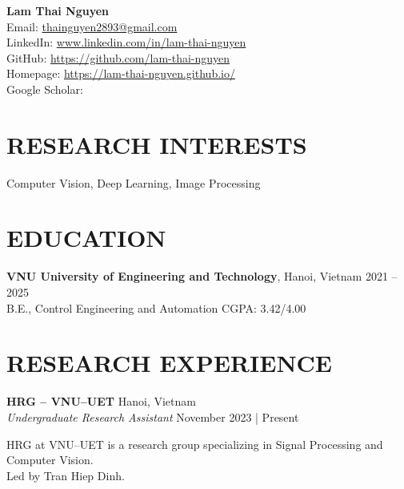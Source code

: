 \documentclass[a4paper,9pt]{extarticle}
\begin{document}
\pagestyle{fancy}
\renewcommand{\headrulewidth}{0pt}
\fancyhead{}
\fancyhead[R]{\textit{\today}}
\thispagestyle{empty} %

\begin{flushleft}
\textbf{\LARGE Lam Thai Nguyen}\\[2pt] %
Email: \href{mailto:thainguyen2893@gmail.com}{thainguyen2893@gmail.com} \\
LinkedIn: \href{https://www.linkedin.com/in/lam-thai-nguyen}{www.linkedin.com/in/lam-thai-nguyen} \\
GitHub: \href{https://github.com/lam-thai-nguyen}{https://github.com/lam-thai-nguyen}\\
Homepage: \href{https://lam-thai-nguyen.github.io/}{https://lam-thai-nguyen.github.io/} \\
Google Scholar: 
\end{flushleft}

\section*{RESEARCH INTERESTS}
\noindent
Computer Vision, Deep Learning, Image Processing

\section*{EDUCATION}
\noindent
\textbf{VNU University of Engineering and Technology}, Hanoi, Vietnam \hfill 2021 -- 2025\\
B.E., Control Engineering and Automation \hfill CGPA: 3.42/4.00 

\section*{RESEARCH EXPERIENCE}
\noindent
\textbf{HRG -- VNU--UET} \hfill Hanoi, Vietnam  \\ %
\textit{Undergraduate Research Assistant} \hfill November 2023 | Present

\vspace{3pt}\noindent
HRG at VNU--UET is a research group specializing in Signal Processing and Computer Vision. \\ 
Led by Tran Hiep Dinh.
\end{document}
